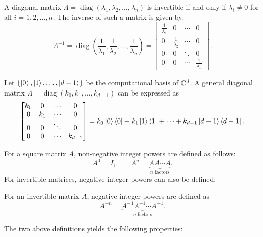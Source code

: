 \documentclass[12pt]{article}
\begin{document}
\begin{theorem}
    A diagonal matrix $\Lambda = \operatorname{diag}(\lambda_{1}, \lambda_{2}, \ldots, \lambda_{n})$ is invertible if and only if $\lambda_{i} \neq 0$ for all $i=1,2,\ldots,n$. The inverse of such a matrix is given by:
    \[
        \Lambda^{-1} = \operatorname{diag} \left( \frac{1}{\lambda_{1}}, \frac{1}{\lambda_{2}}, \ldots, \frac{1}{\lambda_{n}} \right) =
        \begin{bmatrix}
        \frac{1}{\lambda_{1}} & 0 & \cdots & 0 \\
        0 & \frac{1}{\lambda_{2}} & \cdots & 0 \\
        0 & 0 & \ddots & 0 \\
        0 & 0 & \cdots & \frac{1}{\lambda_{n}}
        \end{bmatrix}.
    \]
\end{theorem}


\begin{theorem}
    Let $\{\ket{0}, \ket{1}, \ldots, \ket{d-1}\}$ be the computational basis of $\mathbb{C}^{d}$. A general diagonal matrix $\Lambda = \operatorname{diag}(k_{0}, k_{1}, \ldots, k_{d-1})$ can be expressed as
    \[
        \begin{bmatrix}
        k_{0} & 0 & \cdots & 0 \\
        0 & k_{1} & \cdots & 0 \\
        0 & 0 & \ddots & 0 \\
        0 & 0 & \cdots & k_{d-1}
        \end{bmatrix}
        = k_{0}\ket{0}\bra{0} + k_{1}\ket{1}\bra{1} + \cdots + k_{d-1}\ket{d-1}\bra{d-1}.
    \]
\end{theorem}

\begin{definition}
    For a square matrix $A$, non-negative integer powers are defined as follows:
    \[
        A^{0} = I, \qquad A^{n} = \underbrace{AA \cdots A}_{n \text{ factors}}.
    \]
    For invertible matrices, negative integer powers can also be defined:
\end{definition}

\begin{definition}
    For an invertible matrix $A$, negative integer powers are defined as
    \[
        A^{-n} = \underbrace{A^{-1}A^{-1} \cdots A^{-1}}_{n \text{ factors}}.
    \]
\end{definition}

The two above definitions yields the following properties:
\end{document}
